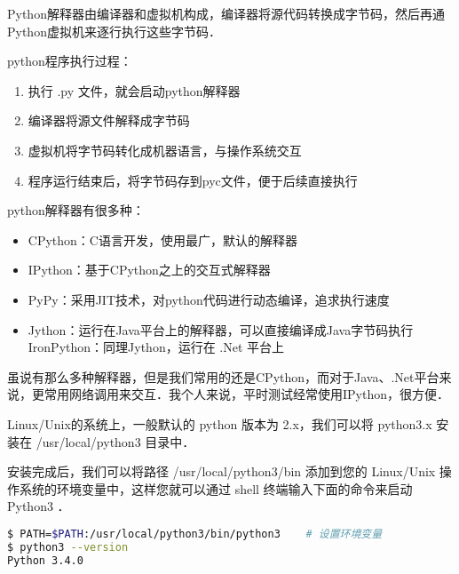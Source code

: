 
\begin{issues}
\issueTODO
\end{issues}


Python解释器由编译器和虚拟机构成，编译器将源代码转换成字节码，然后再通Python虚拟机来逐行执行这些字节码．

python程序执行过程：

\begin{enumerate}
\item 执行 .py 文件，就会启动python解释器

\item 编译器将源文件解释成字节码

\item 虚拟机将字节码转化成机器语言，与操作系统交互

\item 程序运行结束后，将字节码存到pyc文件，便于后续直接执行
\end{enumerate}

python解释器有很多种：

\begin{itemize}
\item CPython：C语言开发，使用最广，默认的解释器

\item IPython：基于CPython之上的交互式解释器

\item PyPy：采用JIT技术，对python代码进行动态编译，追求执行速度

\item Jython：运行在Java平台上的解释器，可以直接编译成Java字节码执行
IronPython：同理Jython，运行在 .Net 平台上
\end{itemize}

虽说有那么多种解释器，但是我们常用的还是CPython，而对于Java、.Net平台来说，更常用网络调用来交互．我个人来说，平时测试经常使用IPython，很方便．

Linux/Unix的系统上，一般默认的 python 版本为 2.x，我们可以将 python3.x 安装在 /usr/local/python3 目录中．

安装完成后，我们可以将路径 /usr/local/python3/bin 添加到您的 Linux/Unix 操作系统的环境变量中，这样您就可以通过 shell 终端输入下面的命令来启动 Python3 ．

\begin{lstlisting}[language=bash]
$ PATH=$PATH:/usr/local/python3/bin/python3    # 设置环境变量
$ python3 --version
Python 3.4.0
\end{lstlisting}

